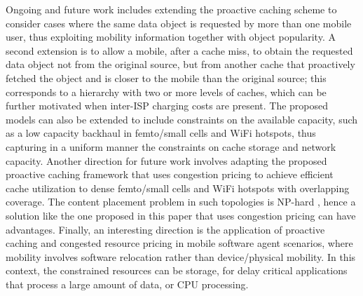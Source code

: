 \documentclass[conference]{IEEEtran}
\newcommand{\mynote}[1]{{{\medskip
\footnotesize \em \noindent Note: #1}}\medskip}
\renewcommand{\mynote}[1]{}
\begin{document}
Ongoing and future work includes extending the proactive caching scheme to consider cases where the same data object is requested by more than one mobile user, thus exploiting mobility information together with  object popularity.
A second extension  is to allow a mobile, after a cache miss, to obtain the requested data object not from the original source, but from another cache that proactively fetched the object and is closer to the mobile than the original source; this corresponds to a hierarchy with two or more levels of caches, which can be further motivated when inter-ISP charging costs are present.
The proposed models can also be extended to include constraints on the available capacity, such as  a low capacity backhaul in femto/small cells  and WiFi hotspots, thus capturing in a uniform manner the constraints on cache storage and network capacity.
Another direction for future work involves adapting the proposed proactive caching framework that uses congestion pricing to achieve efficient cache utilization to  dense femto/small cells and WiFi hotspots with overlapping coverage. The content placement problem in such topologies is NP-hard \cite{Gol++12}, hence a solution like the one proposed in this paper that uses congestion pricing can have advantages.
Finally, an interesting direction is the application of proactive caching and congested resource pricing in mobile software agent scenarios, where mobility involves software relocation rather than device/physical mobility. In this context, the constrained resources can be storage, for delay critical applications that process a large amount of data, or CPU processing.

\mynote{
\begin{itemize}
\item Although problem is different from replication and traditional caching, a congestion pricing approach to reflect cost of caching can also be applied. In particular, we can extend the models in the paper by assuming  that the same data object is requested by more than one mobiles.
\item take into account popularity, hence case where mobiles ask for same objects.
\item application of efficient proactive caching approach to case of dense WLANs with overlapping coverage, \cite{Gol++12}.
\item Utility model can be extended to account for link (WiFi, backhaul) congestion. This may not be that exciting. On the other hand, a motivation can be that we uniformly address both storage and capacity constraints.
\end{itemize}
}



\vspace{-0.09in}

\end{document}
